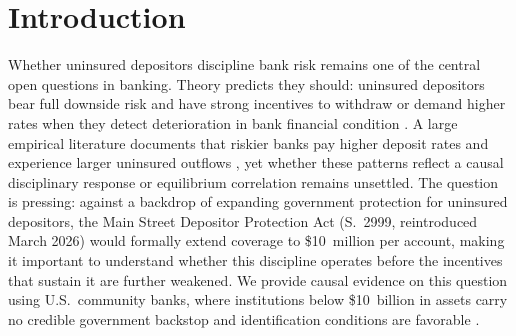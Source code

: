 
\section{Introduction}
\label{sec:intro}

Whether uninsured depositors discipline bank risk remains one of the central open
questions in banking.  Theory predicts they should: uninsured depositors bear
full downside risk and have strong incentives to withdraw or demand higher rates
when they detect deterioration in bank financial condition
\citep{calomiris1991role, diamond2001liquidity}.  A large empirical literature
documents that riskier banks pay higher deposit rates and experience larger
uninsured outflows \citep{park1995market, martinez2001depositors,
maechler2006dynamic, iyer2016tale, egan2017deposit}, yet whether these patterns
reflect a causal disciplinary response or equilibrium correlation remains
unsettled.  The question is pressing: against a backdrop of expanding government
protection for uninsured depositors, the Main Street Depositor Protection Act
(S.~2999, reintroduced March 2026) would formally extend coverage to
\$10~million per account, making it important to understand whether this
discipline operates before the incentives that sustain it are further weakened.
We provide causal evidence on this question using U.S.\ community banks, where
institutions below \$10~billion in assets carry no credible government backstop
and identification conditions are favorable \citep{o1990deposit,
flannery1996evidence}.

